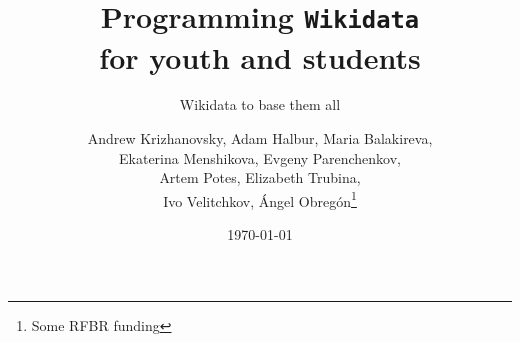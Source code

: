 \documentclass[
	fontsize=10pt, %
	twoside=false, %
	numbers=noenddot, %
]{kaobook}
\begin{document}

\titlehead{The \texttt{kaobook} class}
\subject{Petrozavodsk State University,\\Karelian Research Centre of RAS}

\title[Programming Wikidata for youth and students]{Programming {\normalfont\texttt{Wikidata}} \\ for youth and students}

\subtitle{Wikidata to base them all}

\author[Andrew Krizhanovsky, Adam Halbur, Maria Balakireva, \\ Ekaterina Menshikova, Evgeny Parenchenkov, \\ Artem Potes, Elizabeth Trubina, \\ Ivo Velitchkov, Ángel Obregón]{Andrew Krizhanovsky, Adam Halbur, Maria Balakireva, \\ Ekaterina Menshikova, Evgeny Parenchenkov, \\ Artem Potes, Elizabeth Trubina, \\ Ivo Velitchkov, Ángel Obregón\thanks{Some RFBR funding}}

\date{\today}

\publishers{An Awesome Publisher}


\frontmatter %



\end{document}
